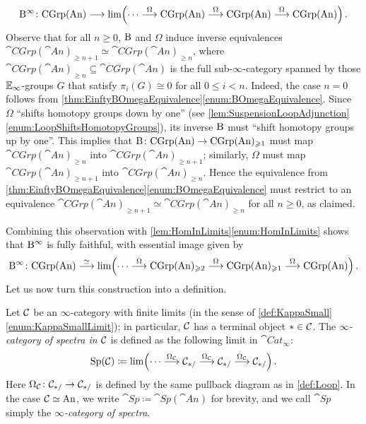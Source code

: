 \begin{con}
	\begin{equation*}
		\B^\infty\colon \cat{CGrp}(\cat{An})\longrightarrow \limit\left(\dotsb\overset{\Omega}{\longrightarrow} \cat{CGrp}(\cat{An})\overset{\Omega}{\longrightarrow} \cat{CGrp}(\cat{An})\overset{\Omega}{\longrightarrow} \cat{CGrp}(\cat{An})\right)\,.
	\end{equation*}
	Observe that for all $n\geqslant 0$, $\mathrm{B}$ and $\Omega$ induce inverse equivalences $\cat{CGrp}(\cat{An})_{\geqslant n+1}\simeq \cat{CGrp}(\cat{An})_{\geqslant n}$, where $\cat{CGrp}(\cat{An})_{\geqslant n}\subseteq \cat{CGrp}(\cat{An})$ is the full sub-$\infty$-category spanned by those $\mathbb{E}_\infty$-groups $G$ that satisfy $\pi_i(G)\cong0$ for all $0\leqslant i<n$. Indeed, the case $n=0$ follows from \cref{thm:EinftyBOmegaEquivalence}\cref{enum:BOmegaEquivalence}. Since $\Omega$ \enquote{shifts homotopy groups down by one} (see \cref{lem:SuspensionLoopAdjunction}\cref{enum:LoopShiftsHomotopyGroups}), its inverse $\mathrm{B}$ must \enquote{shift homotopy groups up by one}. This implies that $\mathrm{B}\colon \mathrm{CGrp}(\mathrm{An})\rightarrow \mathrm{CGrp}(\mathrm{An})_{\geqslant 1}$ must map $\cat{CGrp}(\cat{An})_{\geqslant n}$ into $\cat{CGrp}(\cat{An})_{\geqslant n+1}$; similarly, $\Omega$ must map $\cat{CGrp}(\cat{An})_{\geqslant n+1}$ into $\cat{CGrp}(\cat{An})_{\geqslant n}$. Hence the equivalence from \cref{thm:EinftyBOmegaEquivalence}\cref{enum:BOmegaEquivalence} must restrict to an equivalence $\cat{CGrp}(\cat{An})_{\geqslant n+1}\simeq \cat{CGrp}(\cat{An})_{\geqslant n}$ for all $n\geqslant 0$, as claimed.
	
	Combining this observation with \cref{lem:HomInLimits}\cref{enum:HomInLimits} shows that $\mathrm{B}^\infty$ is fully faithful, with essential image given by
	\begin{equation*}
		\B^\infty\colon \cat{CGrp}(\cat{An})\overset{\simeq}{\longrightarrow}\limit\left(\dotsb\overset{\Omega}{\longrightarrow} \cat{CGrp}(\cat{An})_{\geqslant 2}\overset{\Omega}{\longrightarrow} \cat{CGrp}(\cat{An})_{\geqslant 1}\overset{\Omega}{\longrightarrow} \cat{CGrp}(\cat{An})\right)\,.
	\end{equation*}
	Let us now turn this construction into a definition.
\end{con}
\begin{defi}\label{def:Spectra}
	Let $\mathcal{C}$ be an $\infty$-category with finite limits (in the sense of \cref{def:KappaSmall}\cref{enum:KappaSmallLimit}); in particular, $\mathcal{C}$ has a terminal object $*\in\mathcal{C}$. The \emph{$\infty$-category of spectra in $\mathcal{C}$} is defined as the following limit in $\cat{Cat}_\infty$:
	\begin{equation*}
		\cat{Sp}(\Cc)\coloneqq \limit\left(\dotsb\overset{\Omega_\Cc}{\longrightarrow} \Cc_{*/}\overset{\Omega_\Cc}{\longrightarrow} \Cc_{*/}\overset{\Omega_\Cc}{\longrightarrow} \Cc_{*/}\right)\,.
	\end{equation*}
	Here $\Omega_{\mathcal{C}}\colon \mathcal{C}_{*/}\rightarrow \mathcal{C}_{*/}$ is defined by the same pullback diagram as in \cref{def:Loop}. In the case $\mathcal{C}\simeq \mathrm{An}$, we write $\cat{Sp}\coloneqq \cat{Sp}(\cat{An})$ for brevity, and we call $\cat{Sp}$ simply the \emph{$\infty$-category of spectra}.
\end{defi}

